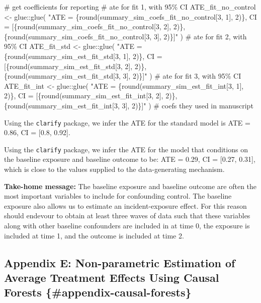 \documentclass[
  singlecolumn]{article}
\newenvironment{Shaded}{}{}
\newcommand{\CommentTok}[1]{\textcolor[rgb]{0.42,0.45,0.49}{#1}}
\newcommand{\FunctionTok}[1]{\textcolor[rgb]{0.44,0.26,0.76}{#1}}
\newcommand{\NormalTok}[1]{\textcolor[rgb]{0.14,0.16,0.18}{#1}}
\newcommand{\OtherTok}[1]{\textcolor[rgb]{0.44,0.26,0.76}{#1}}
\newcommand{\SpecialCharTok}[1]{\textcolor[rgb]{0.00,0.36,0.77}{#1}}
\newcommand{\StringTok}[1]{\textcolor[rgb]{0.01,0.18,0.38}{#1}}
\begin{document}
\begin{Shaded}
\begin{Highlighting}[]
\CommentTok{\# get coefficients for reporting}
\CommentTok{\# ate for fit 1, with 95\% CI}
\NormalTok{ATE\_fit\_no\_control  }\OtherTok{\textless{}{-}}\NormalTok{ glue}\SpecialCharTok{::}\FunctionTok{glue}\NormalTok{(}
  \StringTok{"ATE = \{round(summary\_sim\_coefs\_fit\_no\_control[3, 1], 2)\}, }
\StringTok{  CI = [\{round(summary\_sim\_coefs\_fit\_no\_control[3, 2], 2)\},}
\StringTok{  \{round(summary\_sim\_coefs\_fit\_no\_control[3, 3], 2)\}]"}
\NormalTok{)}
\CommentTok{\# ate for fit 2, with 95\% CI}
\NormalTok{ATE\_fit\_std }\OtherTok{\textless{}{-}}\NormalTok{ glue}\SpecialCharTok{::}\FunctionTok{glue}\NormalTok{(}
  \StringTok{"ATE = \{round(summary\_sim\_est\_fit\_std[3, 1], 2)\}, }
\StringTok{  CI = [\{round(summary\_sim\_est\_fit\_std[3, 2], 2)\},}
\StringTok{  \{round(summary\_sim\_est\_fit\_std[3, 3], 2)\}]"}
\NormalTok{)}
\CommentTok{\# ate for fit 3, with 95\% CI}
\NormalTok{ATE\_fit\_int }\OtherTok{\textless{}{-}}
\NormalTok{  glue}\SpecialCharTok{::}\FunctionTok{glue}\NormalTok{(}
    \StringTok{"ATE = \{round(summary\_sim\_est\_fit\_int[3, 1], 2)\},}
\StringTok{    CI = [\{round(summary\_sim\_est\_fit\_int[3, 2], 2)\},}
\StringTok{    \{round(summary\_sim\_est\_fit\_int[3, 3], 2)\}]"}
\NormalTok{  )}
\CommentTok{\# coefs they used in manuscript}
\end{Highlighting}
\end{Shaded}

Using the \texttt{clarify} package, we infer the ATE for the standard
model is ATE = 0.86, CI = {[}0.8, 0.92{]}.

Using the \texttt{clarify} package, we infer the ATE for the model that
conditions on the baseline exposure and baseline outcome to be: ATE =
0.29, CI = {[}0.27, 0.31{]}, which is close to the values supplied to
the data-generating mechanism.

\textbf{Take-home message:} The baseline exposure and baseline outcome
are often the most important variables to include for confounding
control. The baseline exposure also allows us to estimate an
incident-exposure effect. For this reason should endevour to obtain at
least three waves of data such that these variables along with other
baseline confounders are included in at time 0, the exposure is included
at time 1, and the outcome is included at time 2.

\newpage{}

\subsection{Appendix E: Non-parametric Estimation of Average Treatment
Effects Using Causal Forests
\{\#appendix-causal-forests\}}\label{appendix-e}
\end{document}
